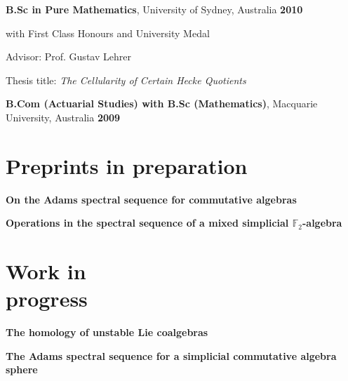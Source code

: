 \documentclass[margin,line]{resume}
\begin{document}
\begin{resume}
    \vspace{-2.5mm}
    \textbf{B.Sc in Pure Mathematics}, University of Sydney, Australia \vspace{1mm} \hfill \textbf{2010}\\%

\vspace{-3mm}
    \begin{list2}
        \item with First Class Honours and University Medal
        \item Advisor: Prof. Gustav Lehrer
        \item Thesis title: \emph{The Cellularity of Certain Hecke Quotients}
    \end{list2}

    
    \vspace{-2.5mm}
    \textbf{B.Com (Actuarial Studies) with B.Sc (Mathematics)}, Macquarie University, Australia \vspace{1mm} \hfill \textbf{2009}%

        \section{\mysidestyle Preprints in preparation}
        
\noindent \textbf{On the Adams spectral sequence for commutative algebras} 

\vspace{-1.5mm}

\noindent \textbf{Operations in the spectral sequence of a mixed simplicial $\mathbb{F}_2$-algebra} 

\vspace{1mm}

        \section{\mysidestyle Work in \\progress}

\noindent \textbf{The homology of unstable Lie coalgebras} 

\vspace{-1.5mm}

\noindent \textbf{The Adams spectral sequence for a simplicial commutative algebra
sphere} 


\end{resume}
\end{document}
